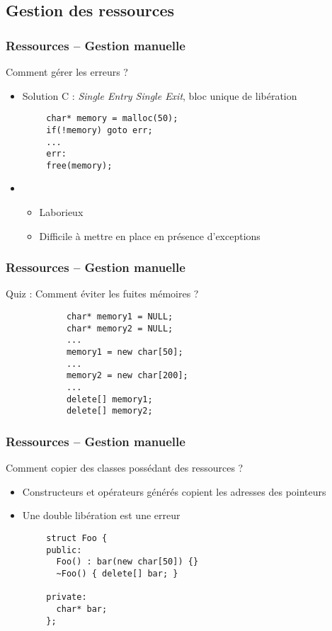 \documentclass[C++.tex]{subfiles}
\begin{document}
\subsection*{Gestion des ressources}
\begin{frame}[fragile]
	\frametitle{Ressources -- Gestion manuelle}
	\begin{alertblock}{}
		Comment gérer les erreurs ?
	\end{alertblock}

	\begin{itemize}
		\item Solution C : \textit{Single Entry Single Exit}, bloc unique de libération
	\end{itemize}

	\begin{verbatim}
		char* memory = malloc(50);
		if(!memory) goto err;
		...
		err:
		free(memory);
	\end{verbatim}

	\begin{itemize}
	\item []
		\begin{itemize}
			\item Laborieux
			\item Difficile à mettre en place en présence d'exceptions
		\end{itemize}
	\end{itemize}
\end{frame}

\begin{frame}[fragile]
	\frametitle{Ressources -- Gestion manuelle}
	\begin{block}{Quiz : Comment éviter les fuites mémoires ?}
		\begin{verbatim}
			char* memory1 = NULL;
			char* memory2 = NULL;
			...
			memory1 = new char[50];
			...
			memory2 = new char[200];
			...
			delete[] memory1;
			delete[] memory2;
		\end{verbatim}
	\end{block}
\end{frame}

\begin{frame}[fragile]
	\frametitle{Ressources -- Gestion manuelle}
	\begin{alertblock}{}
		Comment copier des classes possédant des ressources ?
	\end{alertblock}

	\begin{itemize}
		\item Constructeurs et opérateurs générés copient les adresses des pointeurs
		\item Une double libération est une erreur
	\end{itemize}

	\begin{verbatim}
		struct Foo {
		public:
		  Foo() : bar(new char[50]) {}
		  ~Foo() { delete[] bar; }
		
		private:
		  char* bar;
		};
	\end{verbatim}
\end{frame}
\end{document}

